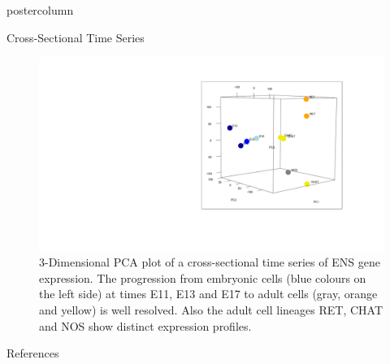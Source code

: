 \documentclass{beamer}
\begin{document}
\begin{frame}
\begin{columns}
\begin{column}{.45\textwidth}
\begin{beamercolorbox}[center]{postercolumn}
\begin{minipage}{.98\textwidth}
{\begin{myblock}{Cross-Sectional Time Series}
\begin{figure}
\begin{minipage}{1.0\textwidth}
	\centering\includegraphics[width=1.0\textwidth]{./bulk_3d}
	\caption{3-Dimensional PCA plot of a cross-sectional time series of ENS
			gene expression. The progression from embryonic cells (blue colours
			on the left side) at times E11, E13 and E17 to adult cells
			(gray, orange and yellow) is well resolved. Also the adult cell
			lineages RET, CHAT and NOS show distinct expression profiles.}
	\label{fig:timeseries}
\end{minipage}
\end{figure}
\end{myblock}\vfill
\begin{myblock}{References}
\footnotesize


\end{myblock}\vfill
}\end{minipage}
\end{beamercolorbox}
\end{column}
\end{columns}
\end{frame}
\end{document}

